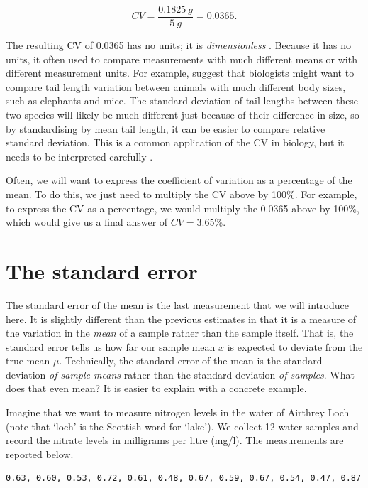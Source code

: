 \documentclass[
]{scrbook}
\begin{document}
\[CV = \frac{0.1825\:g}{5\:g} = 0.0365.\]

The resulting CV of 0.0365 has no units; it is \emph{dimensionless} \citep{Lande1977}.
Because it has no units, it often used to compare measurements with much different means or with different measurement units.
For example, \citet{Sokal1995} suggest that biologists might want to compare tail length variation between animals with much different body sizes, such as elephants and mice.
The standard deviation of tail lengths between these two species will likely be much different just because of their difference in size, so by standardising by mean tail length, it can be easier to compare relative standard deviation.
This is a common application of the CV in biology, but it needs to be interpreted carefully \citep{Pelabon2020}.

Often, we will want to express the coefficient of variation as a percentage of the mean.
To do this, we just need to multiply the CV above by 100\%.
For example, to express the CV as a percentage, we would multiply the 0.0365 above by 100\%, which would give us a final answer of \(CV = 3.65\)\%.

\hypertarget{the-standard-error}{%
\section{The standard error}\label{the-standard-error}}

The standard error of the mean is the last measurement that we will introduce here.
It is slightly different than the previous estimates in that it is a measure of the variation in the \emph{mean} of a sample rather than the sample itself.
That is, the standard error tells us how far our sample mean \(\bar{x}\) is expected to deviate from the true mean \(\mu\).
Technically, the standard error of the mean is the standard deviation \emph{of sample means} rather than the standard deviation \emph{of samples}.
What does that even mean?
It is easier to explain with a concrete example.

Imagine that we want to measure nitrogen levels in the water of Airthrey Loch (note that `loch' is the Scottish word for `lake').
We collect 12 water samples and record the nitrate levels in milligrams per litre (mg/l).
The measurements are reported below.

\begin{verbatim}
0.63, 0.60, 0.53, 0.72, 0.61, 0.48, 0.67, 0.59, 0.67, 0.54, 0.47, 0.87
\end{verbatim}
\end{document}
